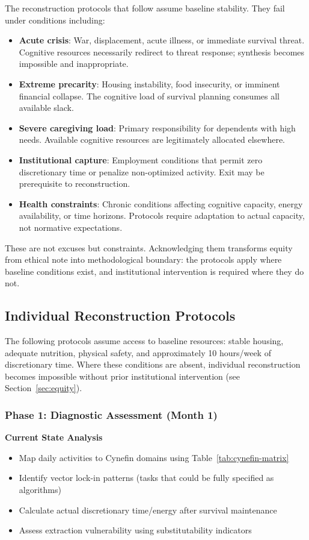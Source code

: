 The reconstruction protocols that follow assume baseline stability. They fail under conditions including:

\begin{itemize}
\item \textbf{Acute crisis}: War, displacement, acute illness, or immediate survival threat. Cognitive resources necessarily redirect to threat response; synthesis becomes impossible and inappropriate.
\item \textbf{Extreme precarity}: Housing instability, food insecurity, or imminent financial collapse. The cognitive load of survival planning consumes all available slack.
\item \textbf{Severe caregiving load}: Primary responsibility for dependents with high needs. Available cognitive resources are legitimately allocated elsewhere.
\item \textbf{Institutional capture}: Employment conditions that permit zero discretionary time or penalize non-optimized activity. Exit may be prerequisite to reconstruction.
\item \textbf{Health constraints}: Chronic conditions affecting cognitive capacity, energy availability, or time horizons. Protocols require adaptation to actual capacity, not normative expectations.
\end{itemize}

These are not excuses but constraints. Acknowledging them transforms equity from ethical note into methodological boundary: the protocols apply where baseline conditions exist, and institutional intervention is required where they do not.

\subsection{Individual Reconstruction Protocols}
\label{sec:individual-protocols}

The following protocols assume access to baseline resources: stable housing, adequate nutrition, physical safety, and approximately 10 hours/week of discretionary time. Where these conditions are absent, individual reconstruction becomes impossible without prior institutional intervention (see Section~\ref{sec:equity}).

\subsubsection{Phase 1: Diagnostic Assessment (Month 1)}

\textbf{Current State Analysis}
\begin{itemize}
\item Map daily activities to Cynefin domains using Table~\ref{tab:cynefin-matrix}
\item Identify vector lock-in patterns (tasks that could be fully specified as algorithms)
\item Calculate actual discretionary time/energy after survival maintenance
\item Assess extraction vulnerability using substitutability indicators
\end{itemize}

